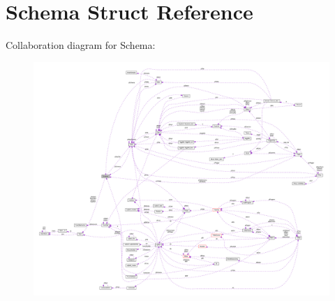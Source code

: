\hypertarget{struct_schema}{\section{Schema Struct Reference}
\label{struct_schema}
}


Collaboration diagram for Schema\-:\nopagebreak
\begin{figure}[H]
\begin{center}
\leavevmode
\includegraphics[width=350pt]{struct_schema__coll__graph}
\end{center}
\end{figure}
